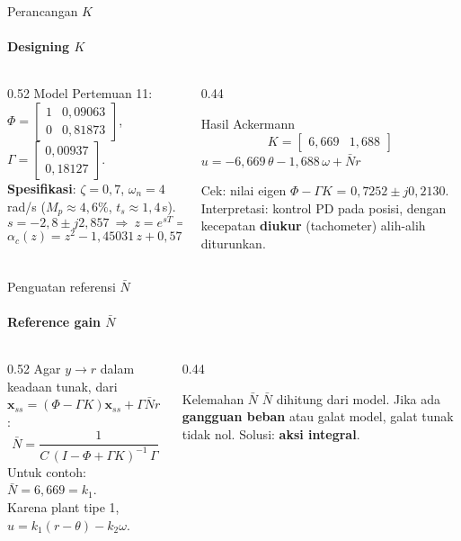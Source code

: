 \documentclass[aspectratio=169,10pt]{beamer}
\begin{document}
\begin{frame}{Perancangan $K$}
	\framesubtitle{Designing $K$}
	\begin{columns}[T]
		\begin{column}{0.52\textwidth}
			\small
			Model Pertemuan 11: $\Phi = \begin{bmatrix}1 & 0{,}09063\\ 0 & 0{,}81873\end{bmatrix}$, $\Gamma = \begin{bmatrix}0{,}00937\\ 0{,}18127\end{bmatrix}$.\\[4pt]
			\textbf{Spesifikasi}: $\zeta = 0{,}7$, $\omega_n = 4$ rad/s ($M_p \approx 4{,}6\%$, $t_s \approx 1{,}4$\,s).
			\[
				s = -2{,}8 \pm j2{,}857\ \Rightarrow\ z = e^{sT} = 0{,}7252 \pm j0{,}2130
			\]
			\[
				\alpha_c(z) = z^2 - 1{,}45031\,z + 0{,}57121
			\]
		\end{column}
		\begin{column}{0.44\textwidth}
			\begin{block}{Hasil Ackermann}
				\small
				\[
					K = \begin{bmatrix} 6{,}669 & 1{,}688\end{bmatrix}
				\]
				$u = -6{,}669\,\theta - 1{,}688\,\omega + \bar Nr$
			\end{block}
			\small
			Cek: nilai eigen $\Phi - \Gamma K$ = $0{,}7252 \pm j0{,}2130$. \checkmark\\[3pt]
			Interpretasi: kontrol PD pada posisi, dengan kecepatan \textbf{diukur} (tachometer) alih-alih diturunkan.
		\end{column}
	\end{columns}
\end{frame}

\begin{frame}{Penguatan referensi $\bar N$}
	\framesubtitle{Reference gain $\bar N$}
	\begin{columns}[T]
		\begin{column}{0.52\textwidth}
			\small
			Agar $y \to r$ dalam keadaan tunak, dari $\mathbf{x}_{ss} = (\Phi - \Gamma K)\mathbf{x}_{ss} + \Gamma\bar Nr$:
			\[
				\bar N = \frac{1}{C\,(I - \Phi + \Gamma K)^{-1}\,\Gamma}
			\]
			Untuk contoh: $\bar N = 6{,}669 = k_1$.\\[3pt]
			Karena plant tipe 1, $u = k_1(r - \theta) - k_2\omega$.
		\end{column}
		\begin{column}{0.44\textwidth}
			\begin{alertblock}{Kelemahan $\bar N$}
				\small
				$\bar N$ dihitung dari model. Jika ada \textbf{gangguan beban} atau galat model, galat tunak tidak nol. Solusi: \textbf{aksi integral}.
			\end{alertblock}
		\end{column}
	\end{columns}
\end{frame}
\end{document}
